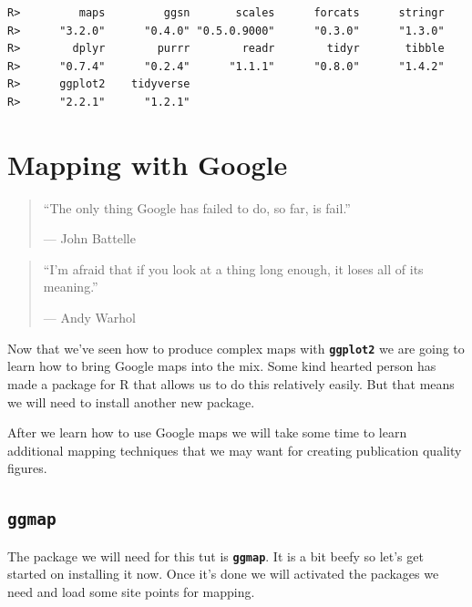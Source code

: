 \documentclass[]{book}
\newenvironment{Shaded}{\begin{snugshade}}{\end{snugshade}}
\newcommand{\KeywordTok}[1]{\textcolor[rgb]{0.13,0.29,0.53}{\textbf{#1}}}
\newcommand{\StringTok}[1]{\textcolor[rgb]{0.31,0.60,0.02}{#1}}
\newcommand{\OperatorTok}[1]{\textcolor[rgb]{0.81,0.36,0.00}{\textbf{#1}}}
\newcommand{\NormalTok}[1]{#1}
\theoremstyle{definition}
\theoremstyle{definition}
\theoremstyle{definition}
\theoremstyle{remark}
\begin{document}
\begin{Shaded}
\end{Shaded}

\begin{verbatim}
R>         maps         ggsn       scales      forcats      stringr 
R>      "3.2.0"      "0.4.0" "0.5.0.9000"      "0.3.0"      "1.3.0" 
R>        dplyr        purrr        readr        tidyr       tibble 
R>      "0.7.4"      "0.2.4"      "1.1.1"      "0.8.0"      "1.4.2" 
R>      ggplot2    tidyverse 
R>      "2.2.1"      "1.2.1"
\end{verbatim}

\chapter{Mapping with Google}\label{mapping_google}

\begin{quote}
``The only thing Google has failed to do, so far, is fail.''

--- John Battelle
\end{quote}

\begin{quote}
``I'm afraid that if you look at a thing long enough, it loses all of
its meaning.''

--- Andy Warhol
\end{quote}

Now that we've seen how to produce complex maps with
\textbf{\texttt{ggplot2}} we are going to learn how to bring Google maps
into the mix. Some kind hearted person has made a package for R that
allows us to do this relatively easily. But that means we will need to
install another new package.

After we learn how to use Google maps we will take some time to learn
additional mapping techniques that we may want for creating publication
quality figures.

\section{\texorpdfstring{\textbf{\texttt{ggmap}}}{ggmap}}\label{ggmap}

The package we will need for this tut is \textbf{\texttt{ggmap}}. It is
a bit beefy so let's get started on installing it now. Once it's done we
will activated the packages we need and load some site points for
mapping.
\end{document}
